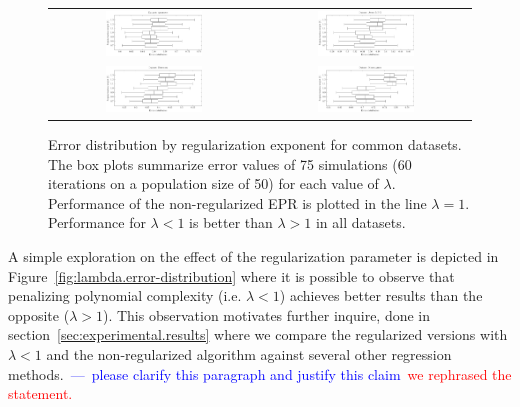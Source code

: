 \documentclass[review,preprint]{elsarticle}
\newcommand{\review}[1]{\textcolor{blue}{~---~#1}}
\newcommand{\revised}[2]{\review{#1}~\textcolor{red}{#2}}
\begin{document}
\begin{figure}[tb]\begin{center}
\begin{tabular}{cc}
\includegraphics[width=0.48\textwidth]{Fig1a.pdf}
&
\includegraphics[width=0.48\textwidth]{Fig1b.pdf}
\\
\includegraphics[width=0.48\textwidth]{Fig1c.pdf}
&
\includegraphics[width=0.48\textwidth]{Fig1d.pdf}
\end{tabular}

\caption{Error distribution by regularization exponent for common datasets. The box plots summarize error values of 75 simulations (60 iterations on a population size of 50) for each value of $\lambda$. Performance of the non-regularized \ac{EPR} is plotted in the line $\lambda = 1$. Performance for $\lambda < 1$ is better than $\lambda > 1$ in all datasets.}
\label{fig:lambda.error-distribution}\label{Abalone_dataset_lambdas}\label{Auto-MPG_dataset_lambdas}

\end{center}\end{figure}

A simple exploration on the effect of the regularization parameter is depicted in Figure~\ref{fig:lambda.error-distribution} where it is possible to observe that penalizing polynomial complexity (i.e. $\lambda < 1$) achieves better results than the opposite ($\lambda > 1$). This observation motivates further inquire, done in section~\ref{sec:experimental.results} where we compare the regularized versions with $\lambda < 1$ and the non-regularized algorithm against several other regression methods.\revised{please clarify this paragraph and justify this claim}{we rephrased the statement.}
\end{document}
